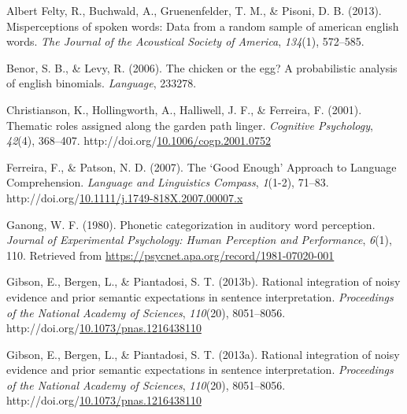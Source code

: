 \documentclass[10pt, letterpaper]{article}
\newenvironment{CSLReferences}%
  {}%
  {\par}
\begin{document}
\hypertarget{refs}{}
\begin{CSLReferences}{1}{0}
\leavevmode{}%
Albert Felty, R., Buchwald, A., Gruenenfelder, T. M., \& Pisoni, D. B.
(2013). Misperceptions of spoken words: Data from a random sample of
american english words. \emph{The Journal of the Acoustical Society of
America}, \emph{134}(1), 572--585.

\leavevmode{}%
Benor, S. B., \& Levy, R. (2006). The chicken or the egg? A
probabilistic analysis of english binomials. \emph{Language}, 233278.

\leavevmode{}%
Christianson, K., Hollingworth, A., Halliwell, J. F., \& Ferreira, F.
(2001). Thematic roles assigned along the garden path linger.
\emph{Cognitive Psychology}, \emph{42}(4), 368--407.
http://doi.org/\href{https://doi.org/10.1006/cogp.2001.0752}{10.1006/cogp.2001.0752}

\leavevmode{}%
Ferreira, F., \& Patson, N. D. (2007). The {`}Good Enough{'} Approach to
Language Comprehension. \emph{Language and Linguistics Compass},
\emph{1}(1-2), 71--83.
http://doi.org/\href{https://doi.org/10.1111/j.1749-818X.2007.00007.x}{10.1111/j.1749-818X.2007.00007.x}

\leavevmode{}%
Ganong, W. F. (1980). Phonetic categorization in auditory word
perception. \emph{Journal of Experimental Psychology: Human Perception
and Performance}, \emph{6}(1), 110. Retrieved from
\url{https://psycnet.apa.org/record/1981-07020-001}

\leavevmode{}%
Gibson, E., Bergen, L., \& Piantadosi, S. T. (2013b). Rational
integration of noisy evidence and prior semantic expectations in
sentence interpretation. \emph{Proceedings of the National Academy of
Sciences}, \emph{110}(20), 8051--8056.
http://doi.org/\href{https://doi.org/10.1073/pnas.1216438110}{10.1073/pnas.1216438110}

\leavevmode{}%
Gibson, E., Bergen, L., \& Piantadosi, S. T. (2013a). Rational
integration of noisy evidence and prior semantic expectations in
sentence interpretation. \emph{Proceedings of the National Academy of
Sciences}, \emph{110}(20), 8051--8056.
http://doi.org/\href{https://doi.org/10.1073/pnas.1216438110}{10.1073/pnas.1216438110}


\end{CSLReferences}
\end{document}
